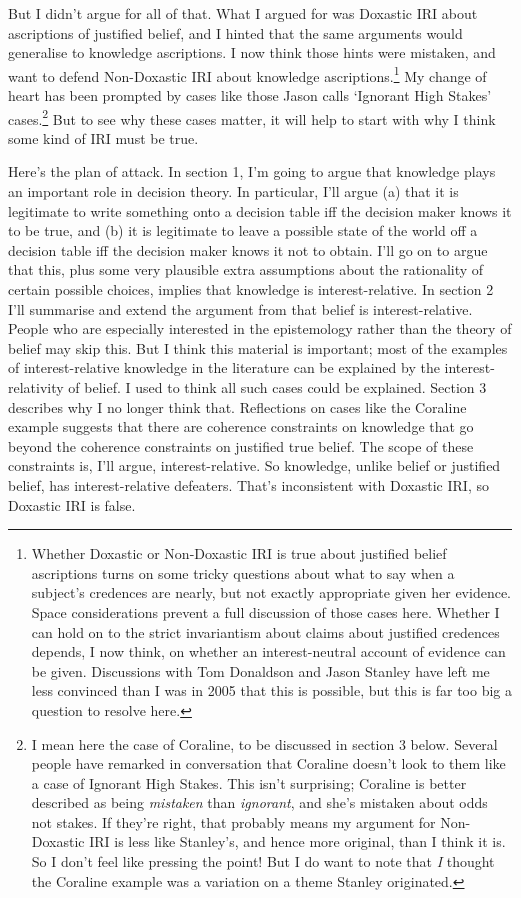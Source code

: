 \documentclass[11pt,oneside]{book}
\begin{document}
\noindent But I didn't argue for all of that. What I argued for was Doxastic IRI about ascriptions of justified belief, and I hinted that the same arguments would generalise to knowledge ascriptions. I now think those hints were mistaken, and want to defend Non-Doxastic IRI about knowledge ascriptions.\footnote{Whether Doxastic or Non-Doxastic IRI is true about justified belief ascriptions turns on some tricky questions about what to say when a subject's credences are nearly, but not exactly appropriate given her evidence. Space considerations prevent a full discussion of those cases here. Whether I can hold on to the strict invariantism about claims about justified credences depends, I now think, on whether an interest-neutral account of evidence can be given. Discussions with Tom Donaldson and Jason Stanley have left me less convinced than I was in 2005 that this is possible, but this is far too big a question to resolve here.} My change of heart has been prompted by cases like those Jason \cite{Stanley2005-STAKAP} calls `Ignorant High Stakes' cases.\footnote{I mean here the case of Coraline, to be discussed in section 3 below. Several people have remarked in conversation that Coraline doesn't look to them like a case of Ignorant High Stakes. This isn't surprising; Coraline is better described as being \textit{mistaken} than \textit{ignorant}, and she's mistaken about odds not stakes. If they're right, that probably means my argument for Non-Doxastic IRI is less like Stanley's, and hence more original, than I think it is. So I don't feel like pressing the point! But I do want to note that \textit{I} thought the Coraline example was a variation on a theme Stanley originated.} But to see why these cases matter, it will help to start with why I think some kind of IRI must be true. 

Here's the plan of attack. In section 1, I'm going to argue that knowledge plays an important role in decision theory. In particular, I'll argue (a) that it is legitimate to write something onto a decision table iff the decision maker knows it to be true, and (b) it is legitimate to leave a possible state of the world off a decision table iff the decision maker knows it not to obtain. I'll go on to argue that this, plus some very plausible extra assumptions about the rationality of certain possible choices, implies that knowledge is interest-relative. In section 2 I'll summarise and extend the argument from \cite{Weatherson2005-WEACWD} that belief is interest-relative. People who are especially interested in the epistemology rather than the theory of belief may skip this. But I think this material is important; most of the examples of interest-relative knowledge in the literature can be explained by the interest-relativity of belief. I used to think all such cases could be explained. Section 3 describes why I no longer think that. Reflections on cases like the Coraline example suggests that there are coherence constraints on knowledge that go beyond the coherence constraints on justified true belief. The scope of these constraints is, I'll argue, interest-relative. So knowledge, unlike belief or justified belief, has interest-relative defeaters. That's inconsistent with Doxastic IRI, so Doxastic IRI is false.
\end{document}
